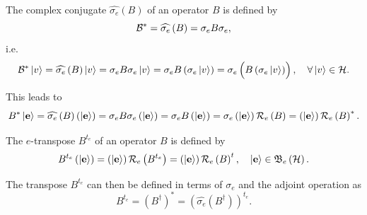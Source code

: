 \begin{definition}
\bigskip The complex conjugate $\widehat{\sigma _{e}}\left( B\right) $ of an
operator $B$ is defined by 
\begin{equation}
{\cal B}^{\ast }=\widehat{\sigma _{e}}\left( B\right) =\sigma _{e}B\sigma
_{e},
\end{equation}%
i.e. 
\begin{equation}
{\cal B}^{\ast }\left\vert v\right\rangle =\widehat{\sigma _{e}}\left(
B\right) \left\vert v\right\rangle =\sigma _{e}B\sigma _{e}\left\vert
v\right\rangle =\sigma _{e}B\left( \sigma _{e}\left\vert v\right\rangle
\right) =\sigma _{e}\left( \stackrel{}{B\left( \sigma _{e}\left\vert
v\right\rangle \right) }\right) ,\quad \forall \left\vert v\right\rangle \in 
{\cal H}.
\end{equation}
\end{definition}

\begin{remark}
This leads to 
\begin{equation}
B^{\ast }\left\vert {\bf e}\right\rangle =\widehat{\sigma _{e}}\left(
B\right) \left( \left\vert {\bf e}\right\rangle \right) =\sigma _{e}B\sigma
_{e}\left( \left\vert {\bf e}\right\rangle \right) =\sigma _{e}B\left(
\left\vert {\bf e}\right\rangle \right) =\sigma _{e}\left( \left\vert {\bf e}%
\right\rangle \right) {\cal R}_{e}\left( B\right) =\left( \left\vert {\bf e}%
\right\rangle \right) {\cal R}_{e}\left( B\right) ^{\ast }.
\end{equation}
\end{remark}

\begin{definition}
The $e$-transpose $B^{t_{e}}$ of an operator $B$ is defined by 
\begin{equation}
B^{t_{e}}\left( \left\vert {\bf e}\right\rangle \right) =\left( \left\vert 
{\bf e}\right\rangle \right) {\cal R}_{e}\left( B^{t_{e}}\right) =\left(
\left\vert {\bf e}\right\rangle \right) {\cal R}_{e}\left( B\right)
^{t},\quad \left\vert {\bf e}\right\rangle \in {\frak B}_{e}\left( {\cal H}%
\right) .
\end{equation}
\end{definition}

\begin{remark}
The transpose $B^{t_{e}}$ can then be defined in terms of $\sigma _{e}$ and
the adjoint operation as 
\begin{equation}
B^{t_{e}}=\left( B^{\dagger }\right) ^{\ast }=\left( \widehat{\sigma _{e}}%
\left( B^{\dagger }\right) \right) ^{t_{e}}.
\end{equation}
\end{remark}

